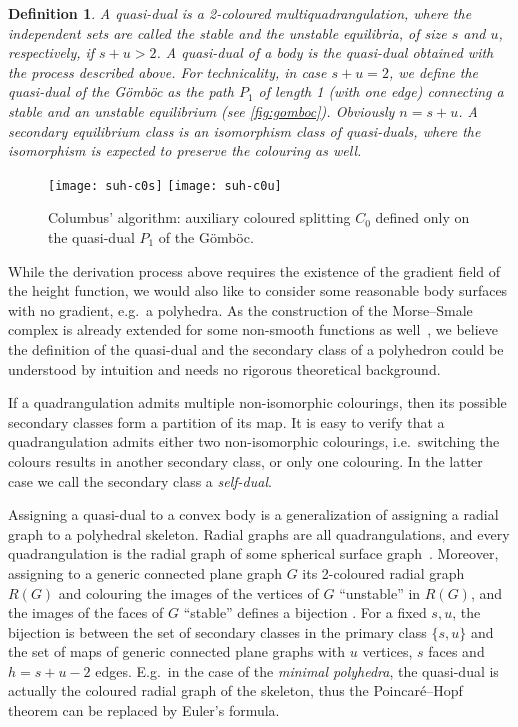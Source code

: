 \documentclass[]{article}
\newtheorem{defn}{Definition}
\newcommand{\Gomboc}{Gömböc\xspace}
\begin{document}
\begin{defn}
A \emph{quasi-dual} is a 2-coloured multiquadrangulation, where the independent sets are called the stable and the unstable equilibria, of size $s$ and $u$, respectively, if $s+u>2$.
  A \emph{quasi-dual of a body} is the quasi-dual obtained with the process described above.
  For technicality, in case $s+u=2$, we define the quasi-dual of the \Gomboc as the path $P_1$ of length 1 (with one edge) connecting a stable and an unstable equilibrium (see \autoref{fig:gomboc}).
  Obviously $n=s+u$.
  A \emph{secondary equilibrium class} is an isomorphism class of quasi-duals, where the isomorphism is expected to preserve the colouring as well.
\end{defn}

\begin{figure}
  \centering
\texttt{[image: suh-c0s]}
  \qquad
  \texttt{[image: suh-c0u]}
  \caption{Columbus' algorithm: auxiliary coloured splitting $C_0$ defined only on the quasi-dual $P_1$ of the \Gomboc.}
  \label{fig:gomboc}
\end{figure}

While the derivation process above requires the existence of the gradient field of the height function, we would also like to consider some reasonable body surfaces with no gradient, e.g.\  a polyhedra.
As the construction of the Morse--Smale complex is already extended for some non-smooth functions as well~\cite{Edelsbrunner2001}, we believe the definition of the quasi-dual and the secondary class of a polyhedron could be understood by intuition and needs no rigorous theoretical background.

If a quadrangulation admits multiple non-isomorphic colourings, then its possible secondary classes form a partition of its map. It is easy to verify that a quadrangulation admits either two non-isomorphic colourings, i.e.\  switching the colours results in another secondary class, or only one colouring.
In the latter case we call the secondary class a \emph{self-dual}.

Assigning a quasi-dual to a convex body is a generalization of assigning a radial graph to a polyhedral skeleton.
Radial graphs are all quadrangulations, and every quadrangulation is the radial graph of some spherical surface graph~\cite{Mohar2001, Brinkmann2005}.
Moreover, assigning to a generic connected plane graph $G$ its 2-coloured radial graph $R(G)$ and colouring the images of the vertices of $G$ ``unstable'' in $R(G)$, and the images of the faces of $G$ ``stable'' defines a bijection \cite{Fusy2007}.
For a fixed $s,u$, the bijection is between the set of secondary classes in the primary class $\{s,u\}$ and the set of maps of generic connected plane graphs with $u$ vertices, $s$ faces and $h=s+u-2$ edges.
E.g.\  in the case of the \emph{minimal polyhedra}, the quasi-dual is actually the coloured radial graph of the skeleton, thus the Poincaré--Hopf theorem can be replaced by Euler's formula.
\end{document}
